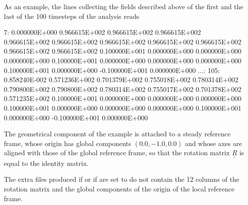 As an example, the lines collecting the fields described above of the 
first and the last of the 100 timesteps of the analysis reads
\begin{inputfile}[frame=single]
  7: 0.000000E+000  0.966615E+002  0.966615E+002  0.966615E+002  0.966615E+002
     0.966615E+002  0.966615E+002  0.966615E+002  0.966615E+002  0.966615E+002
     0.966615E+002  0.100000E+001  0.000000E+000  0.000000E+000  0.000000E+000
     0.100000E+001  0.000000E+000  0.000000E+000  0.000000E+000  0.100000E+001
     0.000000E+000 -0.100000E+001  0.000000E+000
...:
105: 0.858240E-002  0.571236E+002  0.701379E+002  0.755018E+002  0.780314E+002
     0.790800E+002  0.790800E+002  0.780314E+002  0.755017E+002  0.701378E+002
     0.571235E+002  0.100000E+001  0.000000E+000  0.000000E+000  0.000000E+000
     0.100000E+001  0.000000E+000  0.000000E+000  0.000000E+000  0.100000E+001
     0.000000E+000 -0.100000E+001  0.000000E+000
\end{inputfile}
The geometrical component of the example is attached to a steady 
reference frame, whose origin has global components $( 0.0, -1.0, 0.0 )$ 
and whose axes are aligned with those of the global reference frame, so 
that the rotation matrix $\underline{\underline{R}}$ is equal to the 
identity matrix.

The extra files produced if   
or if  are set to  
do not contain the 12 columns of the rotation matrix and 
the global components of the origin of the local reference frame.

